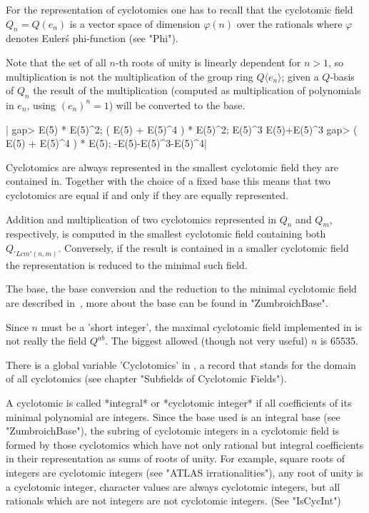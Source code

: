 For the  representation  of  cyclotomics  one  has  to recall that the
cyclotomic  field  $Q_n  =  Q(e_n)$  is a  vector  space  of dimension
$\varphi(n)$  over  the rationals  where  $\varphi$  denotes  Euler\'s
phi-function (see "Phi").

Note that the set  of all $n$-th  roots of unity is linearly dependent
for $n > 1$, so  multiplication is not the multiplication of the group
ring $Q\langle e_n \rangle$; given a $Q$-basis of $Q_n$ the  result of
the  multiplication  (computed  as  multiplication of  polynomials  in
$e_n$, using $(e_n)^n = 1$) will be converted to the base.

|    gap> E(5) * E(5)^2; ( E(5) + E(5)^4 ) * E(5)^2;
    E(5)^3
    E(5)+E(5)^3
    gap> ( E(5) + E(5)^4 ) * E(5);
    -E(5)-E(5)^3-E(5)^4|

Cyclotomics  are always  represented in  the smallest cyclotomic field
they are contained in.  Together with  the choice of a fixed base this
means that two cyclotomics are equal if and only if  they are  equally
represented.

Addition  and multiplication of  two  cyclotomics represented in $Q_n$
and $Q_m$, respectively,  is computed in the smallest cyclotomic field
containing  both\:\ $Q_{'Lcm'(n,m)}$.  Conversely,  if  the result  is
contained in a smaller cyclotomic field the representation  is reduced
to the minimal such field.

The  base,  the  base conversion  and the  reduction  to  the  minimal
cyclotomic field  are  described in~\cite{Zum89},  more about the base
can be found in "ZumbroichBase".

Since $n$  must  be  a 'short integer',  the  maximal cyclotomic field
implemented in {\GAP} is not really the  field $Q^{ab}$.  The  biggest
allowed (though not very useful) $n$ is 65535.

There  is  a  global  variable 'Cyclotomics'  in {\GAP}, a record that
stands for  the domain of  all  cyclotomics (see chapter "Subfields of
Cyclotomic Fields").


A  cyclotomic is called  *integral*  or  *cyclotomic integer*  if  all
coefficients  of its minimal  polynomial are integers. Since  the base
used  is  an  integral  base  (see "ZumbroichBase"),  the  subring  of
cyclotomic  integers  in  a  cyclotomic  field  is  formed   by  those
cyclotomics  which have not only rational but integral coefficients in
their representation as  sums of roots of unity.   For example, square
roots   of   integers   are   cyclotomic    integers    (see    "ATLAS
irrationalities"),  any  root  of  unity   is  a  cyclotomic  integer,
character values  are always cyclotomic  integers,  but  all rationals
which are not integers are not cyclotomic integers.  (See "IsCycInt")

